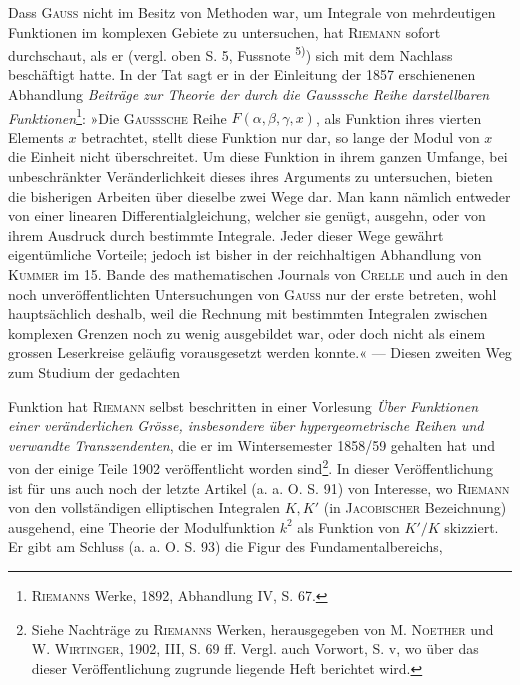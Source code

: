 Dass \textsc{Gauss} nicht im Besitz von Methoden war, um Integrale von mehrdeutigen
Funktionen im komplexen Gebiete zu untersuchen, hat \textsc{Riemann} sofort
durchschaut, als er (vergl. oben S. 5, Fussnote \textsuperscript{5)}) sich mit dem Nachlass
beschäftigt hatte. In der Tat sagt er in der Einleitung der 1857 erschienenen
Abhandlung \textit{Beiträge zur Theorie der durch die Gausssche Reihe darstellbaren
Funktionen}\footnote{\textsc{Riemanns} Werke, 1892, Abhandlung IV, S. 67.}: »Die \textsc{Gausssche} Reihe \(F(\alpha,\beta,\gamma,x)\), als Funktion ihres vierten
Elements \(x\) betrachtet, stellt diese Funktion nur dar, so lange der Modul von
\(x\) die Einheit nicht überschreitet. Um diese Funktion in ihrem ganzen Umfange,
bei unbeschränkter Veränderlichkeit dieses ihres Arguments zu untersuchen,
bieten die bisherigen Arbeiten über dieselbe zwei Wege dar. Man
kann nämlich entweder von einer linearen Differentialgleichung, welcher sie
genügt, ausgehn, oder von ihrem Ausdruck durch bestimmte Integrale. Jeder
dieser Wege gewährt eigentümliche Vorteile; jedoch ist bisher in der reichhaltigen
Abhandlung von \textsc{Kummer} im 15. Bande des mathematischen Journals
von \textsc{Crelle} und auch in den noch unveröffentlichten Untersuchungen von
\textsc{Gauss} nur der erste betreten, wohl hauptsächlich deshalb, weil die Rechnung
mit bestimmten Integralen zwischen komplexen Grenzen noch zu wenig ausgebildet
war, oder doch nicht als einem grossen Leserkreise geläufig vorausgesetzt
werden konnte.« — Diesen zweiten Weg zum Studium der gedachten\par
\clearpage{}
\noindent Funktion hat \textsc{Riemann} selbst beschritten in einer Vorlesung \textit{Über Funktionen
einer veränderlichen Grösse, insbesondere über hypergeometrische Reihen
und verwandte Transzendenten}, die er im Wintersemester 1858/59 gehalten hat
und von der einige Teile 1902 veröffentlicht worden sind\footnote{Siehe Nachträge zu \textsc{Riemanns} Werken, herausgegeben von M. \textsc{Noether} und W. \textsc{Wirtinger}, 1902, III, S. 69 ff. Vergl. auch Vorwort, S. v, wo über das dieser Veröffentlichung zugrunde liegende Heft berichtet wird.}. In dieser Veröffentlichung
ist für uns auch noch der letzte Artikel (a. a. O. S. 91) von Interesse,
wo \textsc{Riemann} von den vollständigen elliptischen Integralen \(K,K'\) (in \textsc{Jacobischer}
Bezeichnung) ausgehend, eine Theorie der Modulfunktion \(k^2\) als Funktion
von \(K'/K\) skizziert. Er gibt am Schluss (a. a. O. S. 93) die Figur des Fundamentalbereichs,
